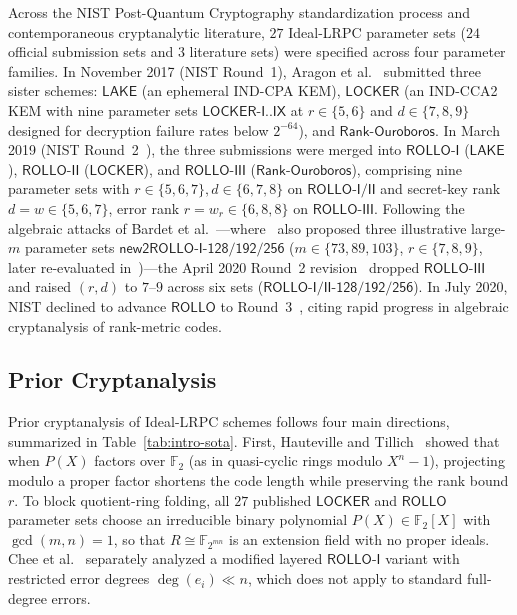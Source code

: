 \documentclass[11pt,a4paper]{article}
\theoremstyle{definition}
\theoremstyle{remark}
\newcommand{\F}{\mathbb{F}}
\newcommand{\Ftwo}{\mathbb{F}_2}
\begin{document}
Across the NIST Post-Quantum Cryptography standardization process and contemporaneous cryptanalytic literature, $27$ Ideal-LRPC parameter sets ($24$ official submission sets and $3$ literature sets) were specified across four parameter families. In November 2017 (NIST Round~1), Aragon et al.~\cite{LOCKER17} submitted three sister schemes: $\mathsf{LAKE}$ (an ephemeral IND-CPA KEM), $\mathsf{LOCKER}$ (an IND-CCA2 KEM with nine parameter sets $\mathsf{LOCKER\text{-}I..IX}$ at $r \in \{5, 6\}$ and $d \in \{7, 8, 9\}$ designed for decryption failure rates below $2^{-64}$), and $\mathsf{Rank\text{-}Ouroboros}$. In March 2019 (NIST Round~2~\cite{ROLLO19}), the three submissions were merged into $\mathsf{ROLLO\text{-}I}$ ($\mathsf{LAKE}$), $\mathsf{ROLLO\text{-}II}$ ($\mathsf{LOCKER}$), and $\mathsf{ROLLO\text{-}III}$ ($\mathsf{Rank\text{-}Ouroboros}$), comprising nine parameter sets with $r \in \{5, 6, 7\}, d \in \{6, 7, 8\}$ on $\mathsf{ROLLO\text{-}I/II}$ and secret-key rank $d = w \in \{5, 6, 7\}$, error rank $r = w_r \in \{6, 8, 8\}$ on $\mathsf{ROLLO\text{-}III}$. Following the algebraic attacks of Bardet et al.~\cite{BBB+20,BBC+20}---where~\cite{BBC+20} also proposed three illustrative large-$m$ parameter sets $\mathsf{new2ROLLO\text{-}I\text{-}128/192/256}$ ($m \in \{73, 89, 103\}$, $r \in \{7, 8, 9\}$, later re-evaluated in~\cite{BBGT23})---the April 2020 Round~2 revision~\cite{ROLLO20} dropped $\mathsf{ROLLO\text{-}III}$ and raised $(r, d)$ to $7\text{--}9$ across six sets ($\mathsf{ROLLO\text{-}I/II\text{-}128/192/256}$). In July 2020, NIST declined to advance $\mathsf{ROLLO}$ to Round~3~\cite{NISTIR8309}, citing rapid progress in algebraic cryptanalysis of rank-metric codes.

\subsection{Prior Cryptanalysis}
Prior cryptanalysis of Ideal-LRPC schemes follows four main directions, summarized in Table~\ref{tab:intro-sota}. First, Hauteville and Tillich~\cite{HT15} showed that when $P(X)$ factors over $\Ftwo$ (as in quasi-cyclic rings modulo $X^n - 1$), projecting modulo a proper factor shortens the code length while preserving the rank bound $r$. To block quotient-ring folding, all $27$ published $\mathsf{LOCKER}$ and $\mathsf{ROLLO}$ parameter sets choose an irreducible binary polynomial $P(X) \in \Ftwo[X]$ with $\gcd(m, n) = 1$, so that $R \cong \F_{2^{mn}}$ is an extension field with no proper ideals. Chee et al.~\cite{CJL+24} separately analyzed a modified layered $\mathsf{ROLLO\text{-}I}$ variant with restricted error degrees $\deg(e_i) \ll n$, which does not apply to standard full-degree errors.
\end{document}
